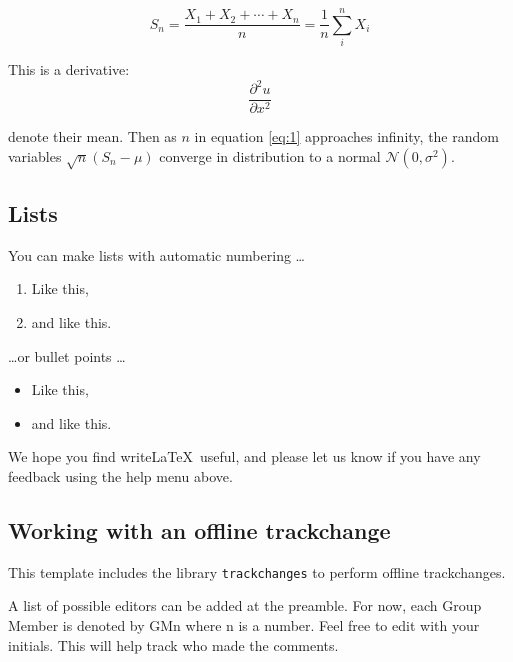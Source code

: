 \documentclass[12pt]{article}
\newcommand{\Deriv}[3]{\dfrac{\partial^#1 #2}{\partial #3^#1}}
\begin{document}
\begin{equation}\label{eq:1}
S_n = \frac{X_1 + X_2 + \cdots + X_n}{n}
      = \frac{1}{n}\sum_{i}^{n} X_i
\end{equation}

This is a derivative:
$$
\Deriv{2}{u}{x}
$$

denote their mean. Then as $n$ in equation \eqref{eq:1} approaches infinity, the random variables $\sqrt{n}(S_n - \mu)$ converge in distribution to a normal $\mathcal{N}(0, \sigma^2)$.

\subsection{Lists}

You can make lists with automatic numbering \dots

\begin{enumerate}
\item Like this,
\item and like this.
\end{enumerate}
\dots or bullet points \dots
\begin{itemize}
\item Like this,
\item and like this.
\end{itemize}

We hope you find write\LaTeX\ useful, and please let us know if you have any feedback using the help menu above.

\subsection{Working with an offline trackchange}

This template includes the library {\tt trackchanges} to perform offline trackchanges.

A list of possible editors can be added at the preamble. For now, each Group Member is denoted by GMn where n is a number. Feel free to edit with your initials. This will help track who made the comments.

\end{document}
